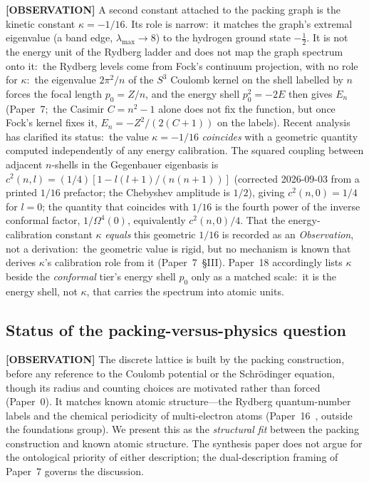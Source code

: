 \documentclass[aps,pra,twocolumn,superscriptaddress,longbibliography]{revtex4-2}
\begin{document}
\textbf{[OBSERVATION]} A second constant attached to the packing graph is the kinetic
constant $\kappa = -1/16$.  Its role is narrow:\ it matches the graph's
extremal eigenvalue (a band edge, $\lambda_{\max} \to 8$) to the
hydrogen ground state $-\tfrac12$.  It is not the energy unit of the
Rydberg ladder and does not map the graph spectrum onto it:\ the
Rydberg levels come from Fock's continuum projection, with no role for
$\kappa$:\ the eigenvalue $2\pi^2/n$ of the $S^3$ Coulomb kernel on the
shell labelled by $n$ forces the focal length $p_0 = Z/n$, and the
energy shell $p_0^2 = -2E$ then gives $E_n$ (Paper~7;\ the Casimir
$C = n^2 - 1$ alone does not fix the function, but once Fock's kernel
fixes it, $E_n = -Z^2/(2(C+1))$ on the labels).  Recent analysis~\cite{loutey_paper18, loutey_paper7} has
clarified its status:\ the value $\kappa = -1/16$ \emph{coincides} with
a geometric quantity computed independently of any energy calibration.
The squared coupling between adjacent $n$-shells in the Gegenbauer
eigenbasis is $c^2(n, l) = (1/4)[1 - l(l+1)/(n(n+1))]$ (corrected
2026-09-03 from a printed $1/16$ prefactor; the Chebyshev amplitude is
$1/2$), giving $c^2(n, 0) = 1/4$ for $l = 0$; the quantity that
coincides with $1/16$ is the fourth power of the inverse conformal factor, $1/\Omega^4(0)$,
equivalently $c^2(n,0)/4$.  That the energy-calibration constant
$\kappa$ \emph{equals} this geometric $1/16$ is recorded as an
\emph{Observation}, not a derivation:\ the geometric value is rigid,
but no mechanism is known that derives $\kappa$'s calibration role from
it (Paper~7~\S III).  Paper~18 accordingly lists $\kappa$ beside the
\emph{conformal} tier's energy shell $p_0$ only as a matched scale:\ it
is the energy shell, not $\kappa$, that carries the spectrum into atomic
units.

\subsection*{Status of the packing-versus-physics question}

\textbf{[OBSERVATION]} The discrete lattice is built by the packing
construction, before any reference to the Coulomb potential or the
Schr\"odinger equation, though its radius and counting choices are
motivated rather than forced (Paper~0).  It matches known atomic
structure---the Rydberg quantum-number labels and the chemical
periodicity of multi-electron atoms (Paper~16~\cite{loutey_paper16},
outside the foundations group).  We present this as the
\emph{structural fit} between the packing construction and known
atomic structure.  The synthesis paper does not argue for the
ontological priority of either description; the dual-description
framing of Paper~7 governs the discussion.
\end{document}
